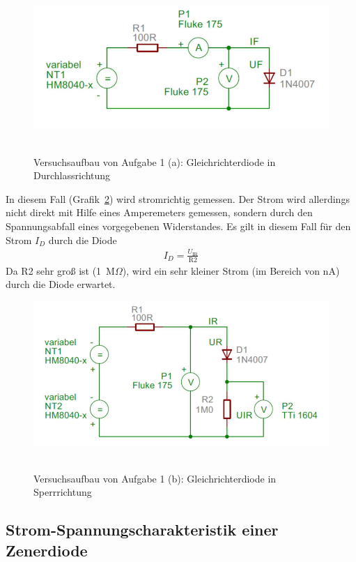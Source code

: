 \documentclass{article}
\begin{document}
\begin{figure}[H]
\caption{Versuchsaufbau von Aufgabe 1 (a): Gleichrichterdiode in Durchlassrichtung}
\label{fig:aufbau_task1a}
{\centering
\includegraphics[scale=1.7]{bilder/aufbau_task1a.png}
~
}
\end{figure}


In diesem Fall (Grafik~\ref{fig:aufbau_task1b}) wird stromrichtig gemessen. Der Strom wird allerdings nicht direkt mit Hilfe eines Amperemeters gemessen, sondern durch den Spannungsabfall eines vorgegebenen Widerstandes. Es gilt in diesem Fall für den Strom $I_D$ durch die Diode
\begin{align*}
I_D = \frac{U_\text{IR}}{\text{R2}}
\end{align*}
Da R2 sehr groß ist (1~M$\Omega$), wird ein sehr kleiner Strom (im Bereich von nA) durch die Diode erwartet.

\begin{figure}[H]
\caption{Versuchsaufbau von Aufgabe 1 (b): Gleichrichterdiode in Sperrrichtung}
\label{fig:aufbau_task1b}
{\centering
\includegraphics[scale=1.7]{bilder/aufbau_task1b.png}
~
}
\end{figure}

\subsection{Strom-Spannungscharakteristik einer Zenerdiode}
\end{document}
